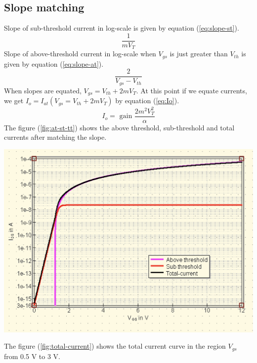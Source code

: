 \documentclass{article}
\begin{document}
\subsection{Slope matching}
Slope of sub-threshold current in log-scale is given by equation (\ref{eq:slope-st}). 
\begin{equation}
    \label{eq:slope-st}
    \frac{1}{mV_T}
\end{equation}
Slope of above-threshold current in log-scale when $V_{gs}$ is just greater than $V_{th}$ is given by equation (\ref{eq:slope-at}). 
\begin{equation}
    \label{eq:slope-at}
    \frac{2}{V_{gs}-V_{th}}
\end{equation}
When slopes are equated, $V_{gs} = V_{th} + 2mV_T$. At this point if we equate currents, we get $I_o = I_{at}(V_{gs}=V_{th}+ 2 m V_T) $ by equation (\ref{eq:Io}). 
\begin{equation}
    \label{eq:Io}
    I_o = \text{ gain } \frac{2 m^2 V_T ^ 2 }{\alpha} 
\end{equation}
The figure (\ref{fig:at-st-tt}) shows the above threshold, sub-threshold and total currents after matching the slope. 
\begin{center}
    \label{fig:at-st-tt}
    \includegraphics[scale = 0.4]{../Images/03082024/slope-Io.png}
\end{center}
The figure (\ref{fig:total-current}) shows the total current curve in the region $V_{gs}$ from 0.5 V to 3 V. 
\end{document}
